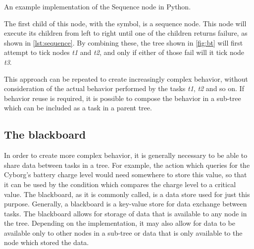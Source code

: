 \documentclass[\rootfolder/main.tex]{subfiles}
\begin{document}
\begin{listing}
    \inputminted{python}{\rootfolder/Chapters/Chapter2/Listings/sequence.py}
    \caption{An example implementation of the Sequence node in Python.\label{lst:sequence}}
\end{listing}

The first child of this node, with the \emph{\rightarrow} symbol, is a sequence node.
This node will execute its children from left to right until one of the children returns failure, as shown in \cref{lst:sequence}.
By combining these, the tree shown in \cref{fig:bt} will first attempt to tick nodes \emph{t1} and \emph{t2}, and only if either of those fail will it tick node \emph{t3}.

This approach can be repeated to create increasingly complex behavior, without consideration of the actual behavior performed by the tasks \emph{t1}, \emph{t2} and so on.
If behavior reuse is required, it is possible to compose the behavior in a sub-tree which can be included as a task in a parent tree.


\subsection{The blackboard}

In order to create more complex behavior, it is generally necessary to be able to share data between tasks in a tree.
For example, the action which queries for the Cyborg's battery charge level would need somewhere to store this value, so that it can be used by the condition which compares the charge level to a critical value.
The blackboard, as it is commonly called, is a data store used for just this purpose.
Generally, a blackboard is a key-value store for data exchange between tasks.
The blackboard allows for storage of data that is available to any node in the tree.
Depending on the implementation, it may also allow for data to be available only to other nodes in a sub-tree or data that is only available to the node which stored the data.

\end{document}

